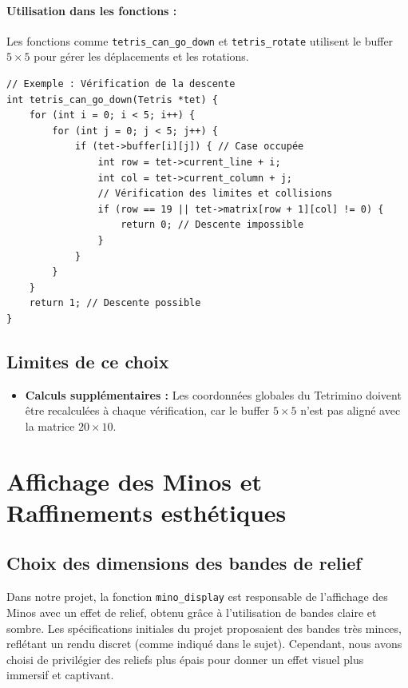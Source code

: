 \documentclass[12pt,a4paper]{report}
\begin{document}
\paragraph{Utilisation dans les fonctions :}
Les fonctions comme \texttt{tetris\_can\_go\_down} et \texttt{tetris\_rotate} utilisent le buffer \(5 \times 5\) pour gérer les déplacements et les rotations.

\begin{lstlisting}
// Exemple : Vérification de la descente
int tetris_can_go_down(Tetris *tet) {
    for (int i = 0; i < 5; i++) {
        for (int j = 0; j < 5; j++) {
            if (tet->buffer[i][j]) { // Case occupée
                int row = tet->current_line + i;
                int col = tet->current_column + j;
                // Vérification des limites et collisions
                if (row == 19 || tet->matrix[row + 1][col] != 0) {
                    return 0; // Descente impossible
                }
            }
        }
    }
    return 1; // Descente possible
}
\end{lstlisting}

\subsection{Limites de ce choix}
\begin{itemize}
    \item \textbf{Calculs supplémentaires :} Les coordonnées globales du Tetrimino doivent être recalculées à chaque vérification, car le buffer \(5 \times 5\) n'est pas aligné avec la matrice \(20 \times 10\).
\end{itemize}

\newpage
\section{Affichage des Minos et Raffinements esthétiques}

\subsection{Choix des dimensions des bandes de relief}
Dans notre projet, la fonction \texttt{mino\_display} est responsable de l'affichage des Minos avec un effet de relief, obtenu grâce à l'utilisation de bandes claire et sombre. Les spécifications initiales du projet proposaient des bandes très minces, reflétant un rendu discret (comme indiqué dans le sujet). Cependant, nous avons choisi de privilégier des reliefs plus épais pour donner un effet visuel plus immersif et captivant.
\\
\end{document}
